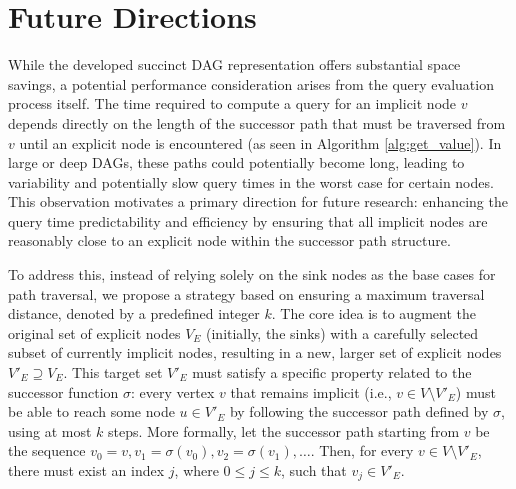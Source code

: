 \section*{Future Directions}

While the developed succinct DAG representation offers substantial space savings, a potential performance consideration arises from the query evaluation process itself. The time required to compute a query for an implicit node $v$ depends directly on the length of the successor path that must be traversed from $v$ until an explicit node is encountered (as seen in Algorithm \ref{alg:get_value}). In large or deep DAGs, these paths could potentially become long, leading to variability and potentially slow query times in the worst case for certain nodes. This observation motivates a primary direction for future research: enhancing the query time predictability and efficiency by ensuring that all implicit nodes are reasonably close to an explicit node within the successor path structure.

To address this, instead of relying solely on the sink nodes as the base cases for path traversal, we propose a strategy based on ensuring a maximum traversal distance, denoted by a predefined integer $k$. The core idea is to augment the original set of explicit nodes $V_E$ (initially, the sinks) with a carefully selected subset of currently implicit nodes, resulting in a new, larger set of explicit nodes $V'_E \supseteq V_E$. This target set $V'_E$ must satisfy a specific property related to the successor function $\sigma$: every vertex $v$ that remains implicit (i.e., $v \in V \setminus V'_E$) must be able to reach some node $u \in V'_E$ by following the successor path defined by $\sigma$, using at most $k$ steps. More formally, let the successor path starting from $v$ be the sequence $v_0=v, v_1=\sigma(v_0), v_2=\sigma(v_1), \dots$. Then, for every $v \in V \setminus V'_E$, there must exist an index $j$, where $0 \le j \le k$, such that $v_j \in V'_E$.

